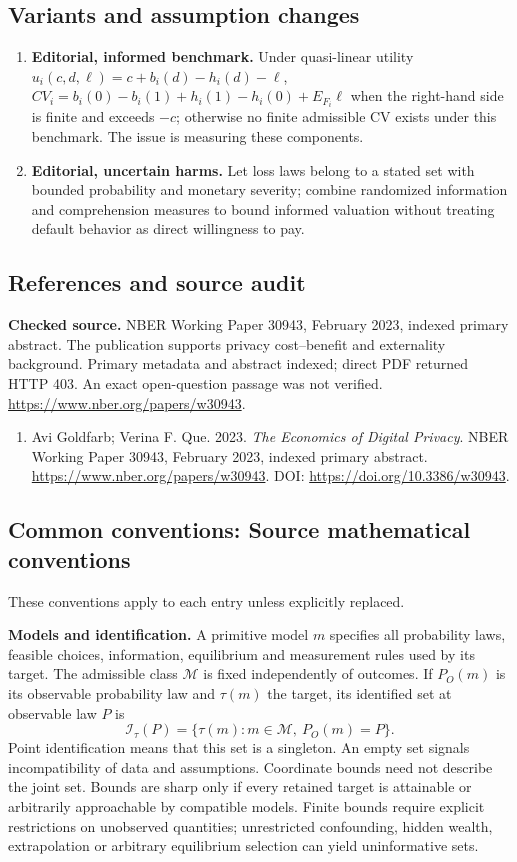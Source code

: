 \documentclass[11pt,a4paper]{article}
\begin{document}
\subsection*{Variants and assumption changes}
\begin{enumerate}
\item \textbf{Editorial, informed benchmark.} Under quasi-linear utility \(u_i(c,d,\ell)=c+b_i(d)-h_i(d)-\ell\), \(CV_i=b_i(0)-b_i(1)+h_i(1)-h_i(0)+E_{F_i}\ell\) when the right-hand side is finite and exceeds \(-c\); otherwise no finite admissible CV exists under this benchmark. The issue is measuring these components.
\item \textbf{Editorial, uncertain harms.} Let loss laws belong to a stated set with bounded probability and monetary severity; combine randomized information and comprehension measures to bound informed valuation without treating default behavior as direct willingness to pay.
\end{enumerate}
\subsection*{References and source audit}
\textbf{Checked source.} NBER Working Paper 30943, February 2023, indexed primary abstract. The publication supports privacy cost--benefit and externality background. Primary metadata and abstract indexed; direct PDF returned HTTP 403. An exact open-question passage was not verified. \url{https://www.nber.org/papers/w30943}.
\begin{enumerate}\raggedright
\item\hypertarget{definitions:source:30007688:1}{} Avi Goldfarb; Verina F. Que. 2023. \emph{The Economics of Digital Privacy}. NBER Working Paper 30943, February 2023, indexed primary abstract.
\url{https://www.nber.org/papers/w30943}.
DOI: \url{https://doi.org/10.3386/w30943}.
\end{enumerate}

\subsection*{Common conventions: Source mathematical conventions}

These conventions apply to each entry unless explicitly replaced.

\textbf{Models and identification.} A primitive model \(m\) specifies all probability laws, feasible choices, information, equilibrium and measurement rules used by its target. The admissible class \(\mathcal M\) is fixed independently of outcomes. If \(P_O(m)\) is its observable probability law and \(\tau(m)\) the target, its identified set at observable law \(P\) is
\[
 \mathcal I_\tau(P)=\{\tau(m):m\in\mathcal M,\ P_O(m)=P\}.
\]
Point identification means that this set is a singleton. An empty set signals incompatibility of data and assumptions. Coordinate bounds need not describe the joint set. Bounds are sharp only if every retained target is attainable or arbitrarily approachable by compatible models. Finite bounds require explicit restrictions on unobserved quantities; unrestricted confounding, hidden wealth, extrapolation or arbitrary equilibrium selection can yield uninformative sets.
\end{document}

